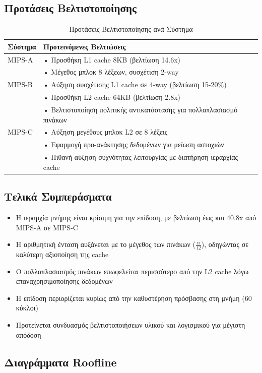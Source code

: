 \documentclass[11pt,a4paper]{article}
\begin{document}
\subsection{Προτάσεις Βελτιστοποίησης}
\begin{table}[H]
\centering
\begin{tabular}{|l|p{11cm}|}
\hline
\textbf{Σύστημα} & \textbf{Προτεινόμενες Βελτιώσεις} \\
\hline
MIPS-A & • Προσθήκη L1 cache 8KB (βελτίωση 14.6x) \\
& • Μέγεθος μπλοκ 8 λέξεων, συσχέτιση 2-way \\
\hline
MIPS-B & • Αύξηση συσχέτισης L1 cache σε 4-way (βελτίωση 15-20\%) \\
& • Προσθήκη L2 cache 64KB (βελτίωση 2.8x) \\
& • Βελτιστοποίηση πολιτικής αντικατάστασης για πολλαπλασιασμό πινάκων \\
\hline
MIPS-C & • Αύξηση μεγέθους μπλοκ L2 σε 8 λέξεις \\
& • Εφαρμογή προ-ανάκτησης δεδομένων για μείωση αστοχιών \\
& • Πιθανή αύξηση συχνότητας λειτουργίας με διατήρηση ιεραρχίας cache \\
\hline
\end{tabular}
\caption{Προτάσεις Βελτιστοποίησης ανά Σύστημα}
\label{tab:optimization-proposals}
\end{table}

\subsection{Τελικά Συμπεράσματα}
\begin{itemize}
    \item Η ιεραρχία μνήμης είναι κρίσιμη για την επίδοση, με βελτίωση έως και 40.8x από MIPS-A σε MIPS-C
    \item Η αριθμητική ένταση αυξάνεται με το μέγεθος των πινάκων ($\frac{n}{12}$), οδηγώντας σε καλύτερη αξιοποίηση της cache
    \item Ο πολλαπλασιασμός πινάκων επωφελείται περισσότερο από την L2 cache λόγω επαναχρησιμοποίησης δεδομένων
    \item Η επίδοση περιορίζεται κυρίως από την καθυστέρηση πρόσβασης στη μνήμη (60 κύκλοι)
    \item Προτείνεται συνδυασμός βελτιστοποιήσεων υλικού και λογισμικού για μέγιστη απόδοση
\end{itemize}

\subsection{Διαγράμματα Roofline}
\end{document}
